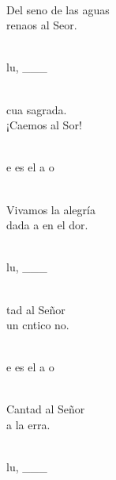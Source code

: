 \documentclass[12pt]{article}
\begin{document}
\begin{multicols*}{2}
\begin{cancion}
	\jump\\
Del seno de las aguas\\
	renaos al Seor.\\\jump\\
	\begin{chorus}%
	lu, ___\\
	\end{chorus}%
	\jump\\
	cua sagrada.\\
	¡Caemos al Sor!\\\jump\\
	\begin{chorus}%
	e es el a  o \\
	\end{chorus}%
	\jump\\
Vivamos la alegría\\
	dada a  en el dor.\\\jump\\
	\begin{chorus}%
	lu, ___\\
	\end{chorus}%
	\jump\\
	tad al Señor\\
	un cntico no.\\\jump\\
	\begin{chorus}%
	e es el a  o \\
	\end{chorus}%
	\jump\\
Cantad al Señor\\
	a la erra.\\\jump\\
	\begin{chorus}%
	lu, ___\\
	\end{chorus}%
	\jump\\

\end{cancion}
\end{multicols*}
\end{document}
